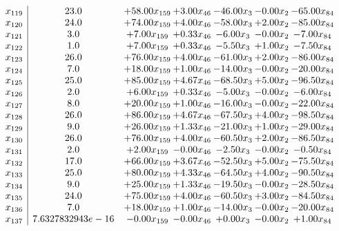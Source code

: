 \documentclass[8pt]{article}
\begin{document}
\[\begin{array}{c| c c@{\hskip 2pt} c@{\hskip 2pt} c@{\hskip 2pt} c@{\hskip 2pt} c@{\hskip 2pt} }
 x_{119}   &  23.0 & + 58.00 x_{159} & +  3.00 x_{46} & -46.00 x_{3} & -0.00 x_{2} & -65.00 x_{84}\\
 x_{120}   &  24.0 & + 74.00 x_{159} & +  4.00 x_{46} & -58.00 x_{3} & +  2.00 x_{2} & -85.00 x_{84}\\
 x_{121}   &  3.0 & +  7.00 x_{159} & +  0.33 x_{46} & -6.00 x_{3} & -0.00 x_{2} & -7.00 x_{84}\\
 x_{122}   &  1.0 & +  7.00 x_{159} & +  0.33 x_{46} & -5.50 x_{3} & +  1.00 x_{2} & -7.50 x_{84}\\
 x_{123}   &  26.0 & + 76.00 x_{159} & +  4.00 x_{46} & -61.00 x_{3} & +  2.00 x_{2} & -86.00 x_{84}\\
 x_{124}   &  7.0 & + 18.00 x_{159} & +  1.00 x_{46} & -14.00 x_{3} & -0.00 x_{2} & -20.00 x_{84}\\
 x_{125}   &  25.0 & + 85.00 x_{159} & +  4.67 x_{46} & -68.50 x_{3} & +  5.00 x_{2} & -96.50 x_{84}\\
 x_{126}   &  2.0 & +  6.00 x_{159} & +  0.33 x_{46} & -5.00 x_{3} & -0.00 x_{2} & -6.00 x_{84}\\
 x_{127}   &  8.0 & + 20.00 x_{159} & +  1.00 x_{46} & -16.00 x_{3} & -0.00 x_{2} & -22.00 x_{84}\\
 x_{128}   &  26.0 & + 86.00 x_{159} & +  4.67 x_{46} & -67.50 x_{3} & +  4.00 x_{2} & -98.50 x_{84}\\
 x_{129}   &  9.0 & + 26.00 x_{159} & +  1.33 x_{46} & -21.00 x_{3} & +  1.00 x_{2} & -29.00 x_{84}\\
 x_{130}   &  26.0 & + 76.00 x_{159} & +  4.00 x_{46} & -60.50 x_{3} & +  2.00 x_{2} & -86.50 x_{84}\\
 x_{131}   &  2.0 & +  2.00 x_{159} & -0.00 x_{46} & -2.50 x_{3} & -0.00 x_{2} & -0.50 x_{84}\\
 x_{132}   &  17.0 & + 66.00 x_{159} & +  3.67 x_{46} & -52.50 x_{3} & +  5.00 x_{2} & -75.50 x_{84}\\
 x_{133}   &  25.0 & + 80.00 x_{159} & +  4.33 x_{46} & -64.50 x_{3} & +  4.00 x_{2} & -90.50 x_{84}\\
 x_{134}   &  9.0 & + 25.00 x_{159} & +  1.33 x_{46} & -19.50 x_{3} & -0.00 x_{2} & -28.50 x_{84}\\
 x_{135}   &  24.0 & + 75.00 x_{159} & +  4.00 x_{46} & -60.50 x_{3} & +  3.00 x_{2} & -84.50 x_{84}\\
 x_{136}   &  7.0 & + 18.00 x_{159} & +  1.00 x_{46} & -14.00 x_{3} & -0.00 x_{2} & -20.00 x_{84}\\
 x_{137}   &  7.6327832943e-16 & -0.00 x_{159} & -0.00 x_{46} & +  0.00 x_{3} & -0.00 x_{2} & +  1.00 x_{84}\\

\end{array}\]
\end{document}
